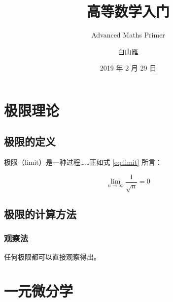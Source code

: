 \documentclass[
    b5paper,  %
    decoration,  %
]{qyxf-book}
\title{高等数学入门}
\subtitle{Advanced Maths Primer}  %
\author{白山雁}
\date{2019 年 2 月 29 日}
\begin{document}
\maketitle

\tableofcontents

\chapter{极限理论}
\section{极限的定义}

极限（limit）是一种过程……正如式 \eqref{eq:limit} 所言：

\begin{equation}\label{eq:limit}
\lim_{n\to\infty}\frac1{\sqrt n} = 0
\end{equation}

\section{极限的计算方法}
\subsection{观察法}

\begin{theorem}
    任何极限都可以直接观察得出。
\end{theorem}

\chapter{一元微分学}
\end{document}
